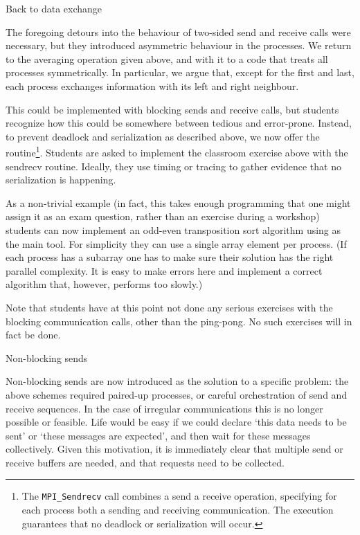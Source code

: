  {Back to data exchange}

The foregoing detours into the behaviour of two-sided send and receive calls
were necessary, but they introduced asymmetric behaviour in the processes.
We return to the averaging operation given above, and with it to a code
that treats all processes symmetrically.
In particular, we argue that, except for the first and last,
each process exchanges information with its left and right neighbour.

This could be implemented with blocking sends and receive calls, but
students recognize how this could be somewhere between tedious and
error-prone.  Instead, to prevent deadlock and serialization as
described above, we now offer the 
routine\footnote{The {\tt MPI\_Sendrecv} call combines a send a receive
  operation, specifying for each process both a sending and receiving
  communication. The execution guarantees that no deadlock or
  serialization will occur.}. Students are asked to implement the
classroom exercise above with the sendrecv routine.  Ideally, they use
timing or tracing to gather evidence that no serialization is
happening.

As a non-trivial example (in fact, this takes enough programming that
one might assign it as an exam question, rather than an exercise
during a workshop) students can now implement an odd-even
transposition sort
algorithm using  as the main tool.
For simplicity they can use a single array element per process.
(If each process has a subarray one has to make sure their solution
has the right parallel complexity. It is easy to make errors here
and implement a correct algorithm that, however, performs too slowly.)

Note that students have at this point not done any serious exercises
with the blocking communication calls, other than the ping-pong.
No such exercises will in fact be done.

 {Non-blocking sends}
\label{sec:nonblock}

Non-blocking sends are now introduced as the solution to a specific problem:
the above schemes required paired-up processes, or careful orchestration
of send and receive sequences. In the case of irregular communications
%
%
this is no longer possible or feasible. Life would be easy if we could
declare `this data needs to be sent' or `these messages are expected',
and then wait for these messages collectively.
Given this motivation, it is immediately clear that multiple send or receive
buffers are needed, and that requests need to be collected.

